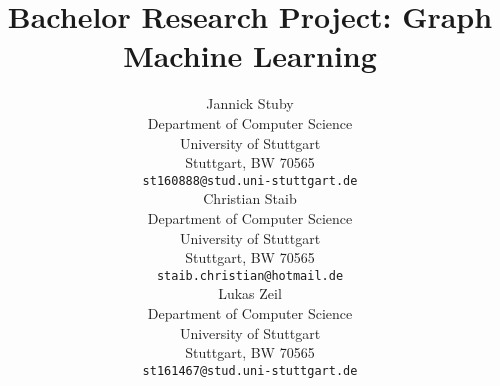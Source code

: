 \documentclass{article}
\title{Bachelor Research Project: Graph Machine Learning}
\author{%
  Jannick Stuby \\
  Department of Computer Science\\
  University of Stuttgart\\
  Stuttgart, BW 70565 \\
  \texttt{st160888@stud.uni-stuttgart.de} \\
  \And
  Christian Staib\\
  Department of Computer Science \\
  University of Stuttgart\\
  Stuttgart, BW 70565 \\
  \texttt{staib.christian@hotmail.de} \\
  \AND
  Lukas Zeil \\
  Department of Computer Science \\
  University of Stuttgart\\
  Stuttgart, BW 70565 \\
  \texttt{st161467@stud.uni-stuttgart.de} \\
}
\begin{document}
\maketitle







\small
\printbibliography
\end{document}
